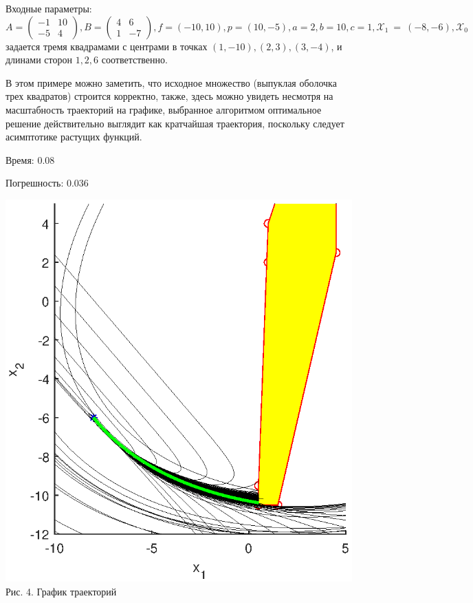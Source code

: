 \documentclass{article}
\theoremstyle{definition}
\begin{document}
Входные параметры: $A = \begin{pmatrix} -1 & 10 \\ -5 & 4\end{pmatrix}, B = \begin{pmatrix} 4 & 6 \\ 1 & -7\end{pmatrix}, 
f = (-10, 10), p = (10,-5), a = 2, b = 10, c = 1, \mathcal{X}_1~=~(-8,-6), \mathcal{X}_0$
 задается тремя квадрамами с центрами в точках $(1, -10), (2,3), (3,-4)$,
и длинами сторон $1, 2, 6$ соответственно.

В этом примере можно заметить, что исходное множество (выпуклая оболочка трех квадратов) строится корректно,
также, здесь можно увидеть несмотря на масштабность траекторий на графике, выбранное алгоритмом
оптимальное решение действительно выглядит как кратчайшая траектория, поскольку следует асимптотике растущих функций.

Время: 0.08

Погрешность: 0.036

\begin{center}
{\includegraphics[width=15cm]{example2.eps}}
{Рис. 4. График траекторий}
\end{center}
\end{document}

